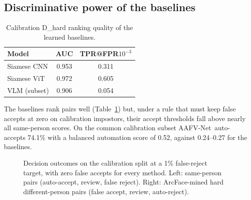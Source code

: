 \documentclass[10pt, a4paper, twocolumn]{article}
\newcommand{\sys}{AAFV-Net}
\begin{document}
\subsection{Discriminative power of the baselines}
\begin{table}[h]
\centering\small
\caption{Calibration D\_hard ranking quality of the learned baselines.}
\label{tab:base}
\begin{tabular}{@{}lcc@{}}
\toprule
Model & AUC & TPR@FPR$10^{-3}$\\\midrule
Siamese CNN & 0.953 & 0.311\\
Siamese ViT & 0.972 & 0.605\\
VLM (subset) & 0.906 & 0.054\\\bottomrule
\end{tabular}
\end{table}
The baselines rank pairs well (Table~\ref{tab:base}) but, under a rule that must keep false accepts at zero on calibration impostors, their accept thresholds fall above nearly all same-person scores. On the common calibration subset \sys\ auto-accepts 74.1\% with a balanced automation score of 0.52, against 0.24--0.27 for the baselines. 

\begin{figure}[t]
\centering
{}
\caption{Decision outcomes on the calibration split at a 1\% false-reject target, with zero false accepts for every method. Left: same-person pairs (auto-accept, review, false reject). Right: ArcFace-mined hard different-person pairs (false accept, review, auto-reject).}
\label{fig:outcomes}
\end{figure}
\end{document}
